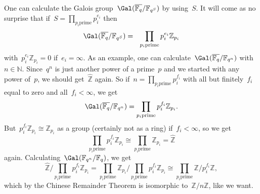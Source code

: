 One can calculate the Galois group~$\Gal(\overline{\mathbb{F}_q}/\mathbb{F}_{q^S})$ by using~$S$. It will come as no surprise that if~$S = \prod_{p_i \text{prime}} p_i^{e_i}$ then
\begin{equation}
  \Gal(\overline{\mathbb{F}_q}/\mathbb{F}_{q^S}) =  \prod_{p_i \text{prime}} p_i^{e_i} \mathbb{Z}_{p_i} 
\end{equation}
with~$p_i^{e_i}\mathbb{Z}_{p_i} = 0$ if~$e_i=\infty$. As an example, one can calculate~$\Gal(\overline{\mathbb{F}_q}/\mathbb{F}_{q^n})$ with~$n \in \mathbb{N}$. Since~$q^n$ is just another power of a prime~$p$ and we started with any power of~$p$, we should get~$\widehat{\mathbb{Z}}$ again. So if~$n = \prod_{p_i \text{prime}} p_i^{f_i}$ with all but finitely~$f_i$ equal to zero and all~$f_i < \infty$, we get
\begin{equation}
  \Gal(\overline{\mathbb{F}_q}/\mathbb{F}_{q^n})=\prod_{p_i \text{prime}} p_i^{f_i} \mathbb{Z}_{p_i}.
\end{equation}
But~$p_i^{f_i} \mathbb{Z}_{p_i} \cong \mathbb{Z}_{p_i}$ as a group (certainly not as a ring) if~$f_i < \infty$, so we get
\begin{equation}
  \prod_{p_i \text{prime}} p_i^{f_i} \mathbb{Z}_{p_i} \cong \prod_{p_i \text{prime}} \mathbb{Z}_{p_i} = \widehat{\mathbb{Z}}
\end{equation}
again. Calculating~$\Gal(\mathbb{F}_{q^n}/\mathbb{F}_{q})$, we get
\begin{equation}
  \widehat{\mathbb{Z}}/\prod_{p_i \text{prime}} p_i^{f_i} \mathbb{Z}_{p_i} = \prod_{p_i \text{prime}}\mathbb{Z}_{p_i}/\prod_{p_i \text{prime}} p_i^{f_i} \mathbb{Z}_{p_i} \cong \prod_{p_i \text{prime}} \mathbb{Z}/p_i^{f_i}\mathbb{Z},
\end{equation}
which by the Chinese Remainder Theorem is isomorphic to~$\mathbb{Z}/n\mathbb{Z}$, like we want.
